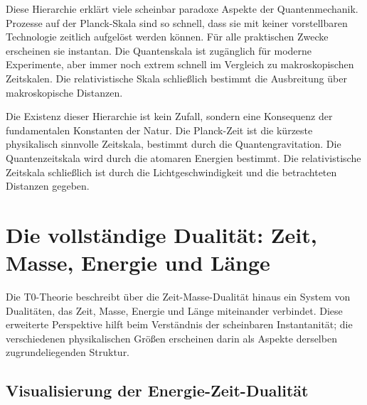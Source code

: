 	Diese Hierarchie erklärt viele scheinbar paradoxe Aspekte der Quantenmechanik. Prozesse auf der Planck-Skala sind so schnell, dass sie mit keiner vorstellbaren Technologie zeitlich aufgelöst werden können. Für alle praktischen Zwecke erscheinen sie instantan. Die Quantenskala ist zugänglich für moderne Experimente, aber immer noch extrem schnell im Vergleich zu makroskopischen Zeitskalen. Die relativistische Skala schließlich bestimmt die Ausbreitung über makroskopische Distanzen.
	
	Die Existenz dieser Hierarchie ist kein Zufall, sondern eine Konsequenz der fundamentalen Konstanten der Natur. Die Planck-Zeit ist die kürzeste physikalisch sinnvolle Zeitskala, bestimmt durch die Quantengravitation. Die Quantenzeitskala wird durch die atomaren Energien bestimmt. Die relativistische Zeitskala schließlich ist durch die Lichtgeschwindigkeit und die betrachteten Distanzen gegeben.
	
	\section{Die vollständige Dualität: Zeit, Masse, Energie und Länge}
	
	Die T0-Theorie beschreibt über die Zeit-Masse-Dualität hinaus ein System von Dualitäten, das Zeit, Masse, Energie und Länge miteinander verbindet. Diese erweiterte Perspektive hilft beim Verständnis der scheinbaren Instantanität; die verschiedenen physikalischen Größen erscheinen darin als Aspekte derselben zugrundeliegenden Struktur.
	
	\subsection{Visualisierung der Energie-Zeit-Dualität}
	
